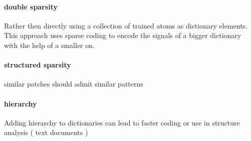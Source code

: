 \paragraph{double sparsity}
Rather then directly using a collection of trained atoms as dictionary elements. This approach uses sparse coding
to encode the signals of a bigger dictionary with the help of a smaller on. \cite{Rubinstein2009} 

\paragraph{structured sparsity}
similar patches should admit similar patterns \cite{Mairal2009}

\cite{group sparsity}

\paragraph{hierarchy}
Adding hierarchy to dictionaries can lead to faster coding or use in structure analysis ( text documents )
\cite{Jenatton2010}




